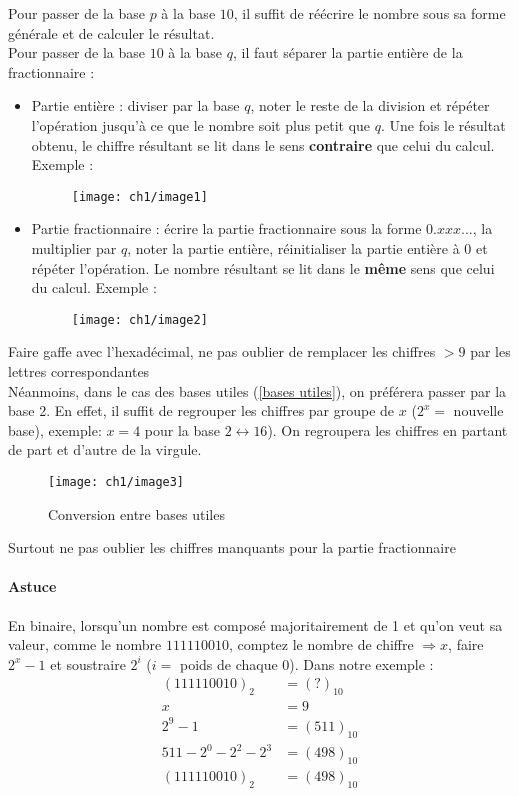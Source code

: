 Pour passer de la base $p$ à la base $10$, il suffit de réécrire le nombre sous sa forme générale et de calculer le résultat. \\
Pour passer de la base $10$ à la base $q$, il faut séparer la partie entière de la fractionnaire :
\begin{itemize}
	\item Partie entière : diviser par la base $q$, noter le reste de la division et répéter l'opération jusqu'à ce que le nombre soit plus petit que $q$. Une fois le résultat obtenu, le chiffre résultant se lit dans le sens \textbf{contraire} que celui du calcul. Exemple :
	\begin{figure}[H]
		\centering
		\texttt{[image: ch1/image1]}
	\end{figure}
	\item Partie fractionnaire : écrire la partie fractionnaire sous la forme $0.xxx...$, la multiplier par $q$, noter la partie entière, réinitialiser la partie entière à $0$ et répéter l'opération. Le nombre résultant se lit dans le \textbf{même} sens que celui du calcul. Exemple :
	\begin{figure}[H]
		\centering
		\texttt{[image: ch1/image2]}
	\end{figure}
\end{itemize}
\danger Faire gaffe avec l'hexadécimal, ne pas oublier de remplacer les chiffres $>9$ par les lettres correspondantes\\

Néanmoins, dans le cas des bases utiles (\autoref{bases utiles}), on préférera passer par la base 2. En effet, il suffit de regrouper les chiffres par groupe de $x$ ($2^x=$ nouvelle base), exemple: $x=4$ pour la base $2\leftrightarrow 16$). On regroupera les chiffres en partant de part et d'autre de la virgule.
\begin{figure}[H]
	\centering
	\texttt{[image: ch1/image3]}
	\caption{Conversion entre bases utiles}
\end{figure}
\danger Surtout ne pas oublier les chiffres manquants pour la partie fractionnaire
\paragraph{Astuce} En binaire, lorsqu'un nombre est composé majoritairement de 1 et qu'on veut sa valeur, comme le nombre $111110010$, comptez le nombre de chiffre $\Rightarrow x$, faire $2^x-1$ et soustraire $2^i$ ($i=$ poids de chaque 0). Dans notre exemple :
\begin{align}
	(111110010)_2 &=(?)_{10}\\
	x &=9\\
	2^9-1 &=(511)_{10}\\
	511-2^0-2^2-2^3 &=(498)_{10}\\
	(111110010)_2 &=(498)_{10}
\end{align}
